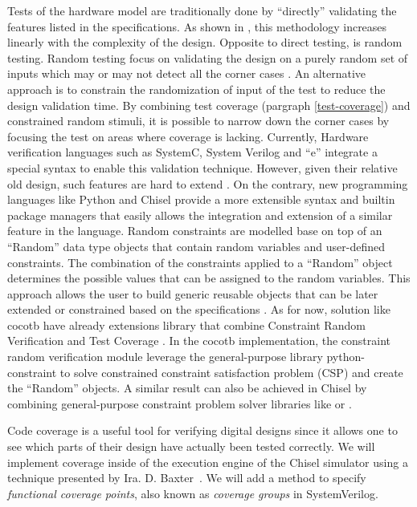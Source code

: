 \documentclass[conference]{IEEEtran}
\begin{document}
Tests of the hardware model are traditionally done by ``directly'' validating the features listed in the specifications. As shown in \cite{spear2008systemverilog}, this methodology increases linearly with the complexity of the design. Opposite to direct testing, is random testing. Random testing focus on validating the design on a purely random set of inputs which may or may not detect all the corner cases \cite{mehta2017a}. An alternative approach is to constrain the randomization of input of the test to reduce the design validation time. By combining test coverage (pargraph \ref{test-coverage}) and constrained random stimuli, it is possible to narrow down the corner cases by focusing the test on areas where coverage is lacking. Currently, Hardware verification languages such as SystemC, System Verilog and ``e'' integrate a special syntax to enable this validation technique. However, given their relative old design, such features are hard to extend \cite{haedicke2012crave} \cite{le2015boosting}. On the contrary, new programming languages like Python and Chisel provide a more extensible syntax and builtin package managers that easily allows the integration and extension of a similar feature in the language. Random constraints are modelled base on top of an ``Random'' data type objects that contain random variables and user-defined constraints.  The combination of the constraints applied to a ``Random'' object determines the possible values that can be assigned to the random variables. This approach allows the user to build generic reusable objects that can be later extended or constrained based on the specifications \cite{cieplucha2016new}\cite{mehta2017a}. As for now, solution like cocotb \cite{rosser2018cocotb}\cite{cocotb2020Sep} have already extensions library that combine Constraint Random Verification and Test Coverage \cite{mciepluc2020Sep}. In the cocotb implementation, the constraint random verification module leverage the general-purpose library python-constraint \cite{python-constraint2020Sep} to solve constrained constraint satisfaction problem (CSP) and create the ``Random'' objects. A similar result can also be achieved in Chisel by combining general-purpose constraint problem solver libraries like \cite{chocoteam2020Sep} or \cite{BibEntry2020Sep}.

Code coverage is a useful tool for verifying digital designs
since it allows one to see which parts of their design have actually been tested correctly. 
We will implement coverage inside of the execution engine of the Chisel simulator using a technique
presented by Ira. D. Baxter~\cite{branch-cov-made-easy:2002}.
We will add a method to specify \textit{functional coverage points}, also known as
\textit{coverage groups} in SystemVerilog.
\end{document}

